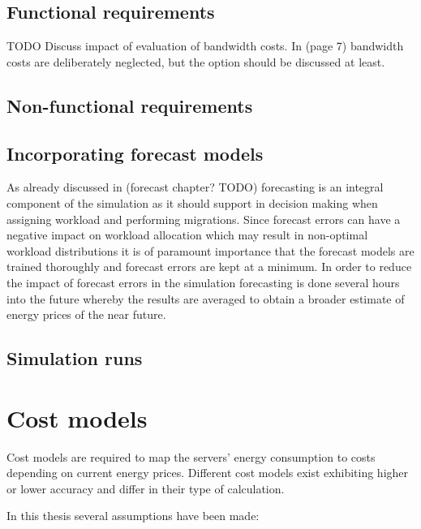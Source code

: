 \subsection{Functional requirements}

TODO Discuss impact of evaluation of bandwidth costs. In \cite{rao2010minimizing} (page 7) bandwidth costs are deliberately neglected, but the option should be discussed at least. 

\subsection{Non-functional requirements}

\subsection{Incorporating forecast models}

As already discussed in (forecast chapter? TODO) forecasting is an integral component of the simulation as it should support in decision making when assigning workload and performing migrations. Since forecast errors can have a negative impact on workload allocation which may result in non-optimal workload distributions \cite{de2013study} it is of paramount importance that the forecast models are trained thoroughly and forecast errors are kept at a minimum. In order to reduce the impact of forecast errors in the simulation forecasting is done several hours into the future whereby the results are averaged to obtain a broader estimate of energy prices of the near future. 


\subsection{Simulation runs}



\section{Cost models}

Cost models are required to map the servers' energy consumption to costs depending on current energy prices. Different cost models exist exhibiting higher or lower accuracy and differ in their type of calculation. 

In this thesis several assumptions have been made: 

